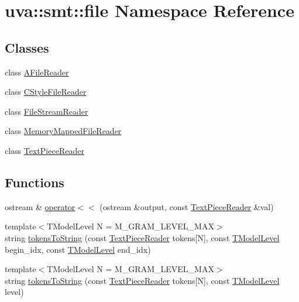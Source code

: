 \hypertarget{namespaceuva_1_1smt_1_1file}{}\section{uva\+:\+:smt\+:\+:file Namespace Reference}
\label{namespaceuva_1_1smt_1_1file}
\subsection*{Classes}
\begin{DoxyCompactItemize}
\item 
class \hyperlink{classuva_1_1smt_1_1file_1_1_a_file_reader}{A\+File\+Reader}
\item 
class \hyperlink{classuva_1_1smt_1_1file_1_1_c_style_file_reader}{C\+Style\+File\+Reader}
\item 
class \hyperlink{classuva_1_1smt_1_1file_1_1_file_stream_reader}{File\+Stream\+Reader}
\item 
class \hyperlink{classuva_1_1smt_1_1file_1_1_memory_mapped_file_reader}{Memory\+Mapped\+File\+Reader}
\item 
class \hyperlink{classuva_1_1smt_1_1file_1_1_text_piece_reader}{Text\+Piece\+Reader}
\end{DoxyCompactItemize}
\subsection*{Functions}
\begin{DoxyCompactItemize}
\item 
ostream \& \hyperlink{namespaceuva_1_1smt_1_1file_a44400e052e7651e30837da4b926ccc66}{operator$<$$<$} (ostream \&output, const \hyperlink{classuva_1_1smt_1_1file_1_1_text_piece_reader}{Text\+Piece\+Reader} \&val)
\item 
{\footnotesize template$<$T\+Model\+Level N = M\+\_\+\+G\+R\+A\+M\+\_\+\+L\+E\+V\+E\+L\+\_\+\+M\+A\+X$>$ }\\string \hyperlink{namespaceuva_1_1smt_1_1file_ac8c535b83a41fdb117f17aa97e6c4c75}{tokens\+To\+String} (const \hyperlink{classuva_1_1smt_1_1file_1_1_text_piece_reader}{Text\+Piece\+Reader} tokens\mbox{[}N\mbox{]}, const \hyperlink{namespaceuva_1_1smt_1_1tries_a20577a44b3a42d26524250634379b7cb}{T\+Model\+Level} begin\+\_\+idx, const \hyperlink{namespaceuva_1_1smt_1_1tries_a20577a44b3a42d26524250634379b7cb}{T\+Model\+Level} end\+\_\+idx)
\item 
{\footnotesize template$<$T\+Model\+Level N = M\+\_\+\+G\+R\+A\+M\+\_\+\+L\+E\+V\+E\+L\+\_\+\+M\+A\+X$>$ }\\string \hyperlink{namespaceuva_1_1smt_1_1file_abe2efb311901054be55640aa2631b2bd}{tokens\+To\+String} (const \hyperlink{classuva_1_1smt_1_1file_1_1_text_piece_reader}{Text\+Piece\+Reader} tokens\mbox{[}N\mbox{]}, const \hyperlink{namespaceuva_1_1smt_1_1tries_a20577a44b3a42d26524250634379b7cb}{T\+Model\+Level} level)
\end{DoxyCompactItemize}


